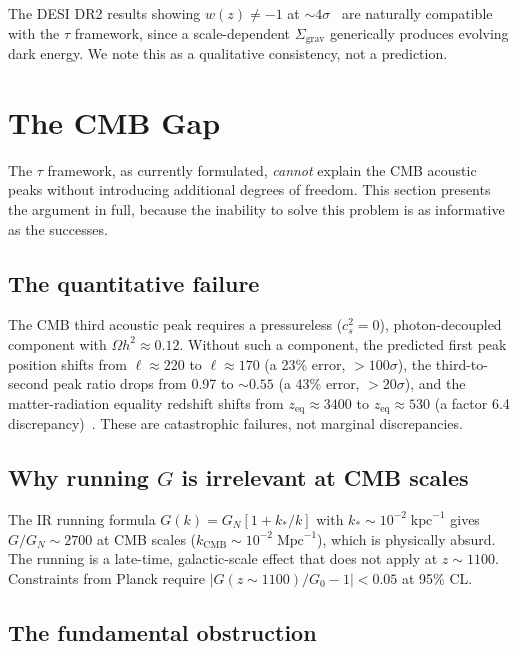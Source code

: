 \documentclass[prd,twocolumn,superscriptaddress,longbibliography,floatfix]{revtex4-2}
\newcommand{\tauasym}{\tau}
\begin{document}
The DESI DR2 results showing $w(z) \neq -1$ at
$\sim\!4\sigma$~\cite{DESI2024} are naturally compatible with
the $\tauasym$ framework, since a scale-dependent
$\Sigma_{\mathrm{grav}}$ generically produces evolving dark
energy.  We note this as a qualitative consistency, not a
prediction.

\section{The CMB Gap}
\label{sec:cmb}

The $\tauasym$ framework, as currently formulated,
\emph{cannot} explain the CMB acoustic peaks without
introducing additional degrees of freedom.  This section
presents the argument in full, because the inability to solve
this problem is as informative as the successes.

\subsection{The quantitative failure}

The CMB third acoustic peak requires a pressureless
($c_s^2 = 0$), photon-decoupled component with
$\Omega h^2 \approx 0.12$.  Without such a component,
the predicted first peak position shifts from $\ell \approx 220$
to $\ell \approx 170$ (a 23\% error, $>100\sigma$),
the third-to-second peak ratio drops from 0.97 to $\sim\!0.55$
(a 43\% error, $>20\sigma$), and the matter-radiation equality
redshift shifts from $z_{\mathrm{eq}} \approx 3400$ to
$z_{\mathrm{eq}} \approx 530$ (a factor 6.4
discrepancy)~\cite{Planck2018,Hu2008}.  These are catastrophic
failures, not marginal discrepancies.

\subsection{Why running $G$ is irrelevant at CMB scales}

The IR running formula $G(k) = G_N[1 + k_*/k]$ with
$k_* \sim 10^{-2}\;\mathrm{kpc}^{-1}$ gives $G/G_N \sim 2700$
at CMB scales ($k_{\mathrm{CMB}} \sim 10^{-2}\;
\mathrm{Mpc}^{-1}$), which is physically absurd.  The running
is a late-time, galactic-scale effect that does not apply at
$z \sim 1100$.  Constraints from Planck require
$|G(z\!\sim\!1100)/G_0 - 1| < 0.05$ at 95\% CL.

\subsection{The fundamental obstruction}
\end{document}
